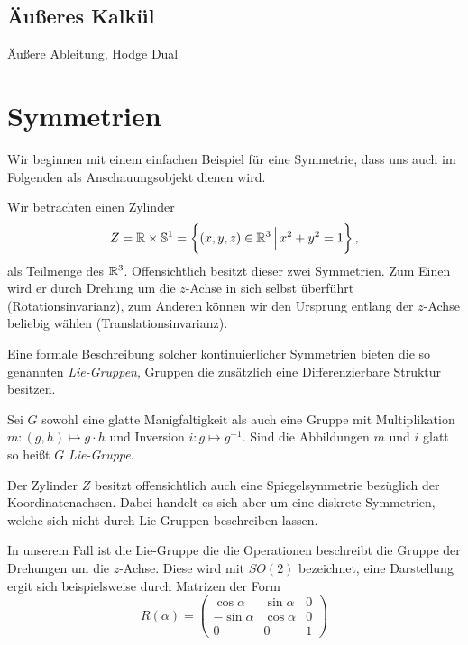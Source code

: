 \subsection{Äußeres Kalkül}
Äußere Ableitung, Hodge Dual
\section{Symmetrien}
Wir beginnen mit einem einfachen Beispiel für eine Symmetrie, dass uns auch im
Folgenden als Anschauungsobjekt dienen wird.
\begin{beispiel}
Wir betrachten einen Zylinder 
\begin{equation}
Z=\Reals\times\Sphere^1=\left\{(x,y,z)\in\Reals^3\,\Big|\,x^2+y^2=1\right\}\,,
\end{equation}
als Teilmenge des $\mathbb{R}^3$. 
Offensichtlich besitzt dieser zwei Symmetrien. Zum Einen wird er durch
Drehung um die $z$-Achse in sich selbst überführt (Rotationsinvarianz), zum
Anderen können wir den Ursprung entlang der $z$-Achse beliebig wählen
(Translationsinvarianz).
\end{beispiel}
Eine formale Beschreibung solcher kontinuierlicher Symmetrien bieten die
so genannten \emph{Lie-Gruppen}, Gruppen die zusätzlich eine Differenzierbare
Struktur besitzen.
\begin{definition}
Sei $G$ sowohl eine glatte Manigfaltigkeit als auch eine Gruppe mit
Multiplikation $m:(g,h)\mapsto g\cdot h$ und Inversion $i:g\mapsto g^{-1}$.
Sind die Abbildungen $m$ und $i$ glatt so heißt $G$ \emph{Lie-Gruppe}.
\end{definition}
\begin{bemerkung}
Der Zylinder $Z$ besitzt offensichtlich auch eine Spiegelsymmetrie bezüglich der
Koordinatenachsen. Dabei
handelt es sich aber um eine diskrete Symmetrien, welche sich nicht durch Lie-Gruppen beschreiben lassen.
\end{bemerkung}
\begin{beispiel}[$SO(n)$]%
\end{beispiel}
In unserem Fall ist die Lie-Gruppe die die Operationen beschreibt die Gruppe der
Drehungen um die $z$-Achse. Diese wird mit $SO(2)$ bezeichnet, eine Darstellung
ergit sich beispielsweise durch Matrizen der Form
\begin{equation}
R(\alpha)=
\begin{pmatrix}
\cos\alpha&\sin\alpha&0\\
-\sin\alpha&\cos\alpha&0\\
0&0&1
\end{pmatrix}
\end{equation}
